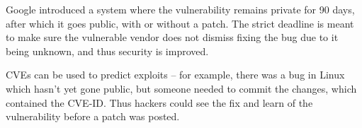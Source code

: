Google introduced a system where the vulnerability remains private for 90 days,
after which it goes public, with or without a patch. The strict deadline is
meant to make sure the vulnerable vendor does not dismiss fixing the bug due to
it being unknown, and thus security is improved.

CVEs can be used to predict exploits – for example, there was a bug in Linux
which hasn't yet gone public, but someone needed to commit the changes, which
contained the CVE-ID. Thus hackers could see the fix and learn of the
vulnerability before a patch was posted.

